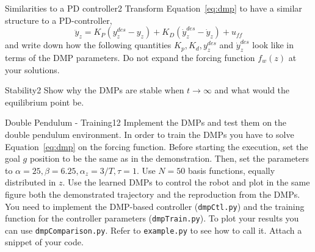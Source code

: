 \begin{questions}


\begin{question}{Similarities to a PD controller}{2}
Transform Equation~\eqref{eq:dmp} to have a similar structure to a PD-controller,
%
\begin{equation}
    \ddot{y}_z = K_P ( y^{des}_z - y_z ) + K_D ( \dot{y}_z^{des} - \dot{y}_z ) +
    u_{ff}
\end{equation}
%
and write down how the following quantities $K_p, K_d, y^{des}_z$ and $\dot{y}_z^{des}$ look like in terms of the DMP parameters. Do not expand the forcing function $f_w(z)$ at your solutions.

\begin{answer}\end{answer}

\end{question}


\begin{question}{Stability}{2}
Show why the DMPs are stable when $t\to\infty$ and what would the equilibrium point be.

\begin{answer}\end{answer}

\end{question}


\begin{question}{Double Pendulum - Training}{12}
Implement the DMPs and test them on the double pendulum environment.
In order to train the DMPs you have to solve Equation~\eqref{eq:dmp} on the forcing function. Before starting the execution, set the goal $g$ position to be the same as in the demonstration. Then, set the parameters to $\alpha=25, \beta=6.25, \alpha_z=3/T, \tau=1$. Use $N=50$ basis functions, equally distributed in $z$.  Use the learned DMPs to control the robot and plot in the same figure both the demonstrated trajectory and the reproduction from the DMPs.
You need to implement the DMP-based controller (\texttt{dmpCtl.py}) and the training function for the controller parameters (\texttt{dmpTrain.py}). To plot your results you can use \texttt{dmpComparison.py}. Refer to \texttt{example.py} to see how to call it. Attach a snippet of your code.


\end{question}
\end{questions}
